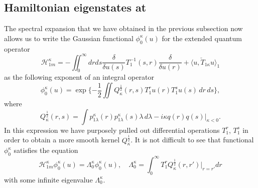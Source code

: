 \documentclass[12pt]{article}
\newcommand{\HH}{\mathscr{H}}
\begin{document}
\subsection{Hamiltonian eigenstates at
}
	The spectral expansion that we have obtained in the previous subsection
	now allows us to write the Gaussian functional
$ \phi_{0}^{\kappa}(u) $
	for the extended quantum operator
\begin{equation*}
    \HH_{1m}^{\kappa} = -\iint_{0}^{\infty} dr ds
    \frac{\delta}{\delta u(s)} T_{1}^{-1}(s,r)
	\frac{\delta}{\delta u(r)}
	+ \langle u, \check{T}_{1\kappa}u\rangle_{1}
\end{equation*}
	as the following exponent of an integral operator
\begin{equation*}
    \phi_{0}^{\kappa}(u)
	= \exp\{-\frac{1}{2} \iint Q_{\kappa}^{\frac{1}{2}}(r,s)
	T_{1}^{r} u(r) T_{1}^{s} u(s) \, dr\,ds\} ,
\end{equation*}
	where
\begin{equation*}
    Q_{\kappa}^{\frac{1}{2}}(r,s) = \int p_{1\lambda}^{\kappa}(r)
	p_{1\lambda}^{\kappa}(s)
	\lambda\,d\lambda - i\kappa q(r)q(s) \bigr|_{\kappa <0} .
\end{equation*}
	In this expression we have purposely pulled out differential operations
$ T_{1}^{r} $, 
$ T_{1}^{s} $
	in order to obtain a more smooth kernel
$ Q_{\kappa}^{\frac{1}{2}} $.
	It is not difficult to see that functional
$ \phi_{0}^{\kappa} $
	satisfies the equation
\begin{equation*}
    \HH_{1m}^{\kappa} \phi_{0}^{\kappa}(u)
	= \Lambda_{0}^{\kappa} \phi_{0}^{\kappa}(u) ,\quad
    \Lambda_{0}^{\kappa} = \int_{0}^{\infty} T_{1}^{r}
	Q_{\kappa}^{\frac{1}{2}}(r,r') |_{r=r'} dr
\end{equation*}
	with some infinite eigenvalue
$ \Lambda_{0}^{\kappa} $.
\end{document}
